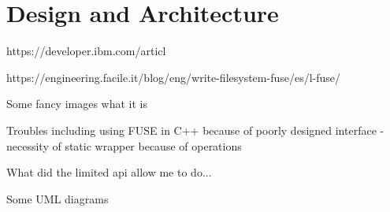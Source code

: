 \chapter{Design and Architecture}

https://developer.ibm.com/articl

https://engineering.facile.it/blog/eng/write-filesystem-fuse/es/l-fuse/

Some fancy images what it is

Troubles including using FUSE in C++ because of poorly designed interface - necessity of static wrapper because of operations

What did the limited api allow me to do...

Some UML diagrams